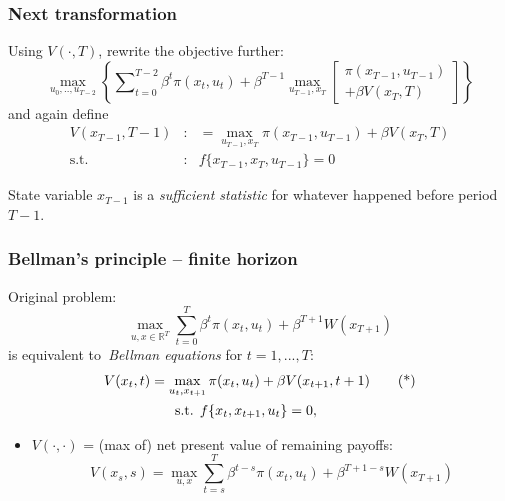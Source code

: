\documentclass[bigger,handout]{beamer}
\newenvironment{stepitemize}{\begin{itemize}[<+->]}{\end{itemize} }
\begin{document}
\begin{frame}%

\frametitle{Next transformation}

Using $V(\cdot ,T)$, rewrite the objective further:%
\begin{equation*}
\max_{u_{0},..,u_{T-2}}\left\{ \sum\nolimits_{t=0}^{T-2}\beta ^{t}\pi
(x_{t},u_{t})+\beta ^{T-1}\max_{u_{T-1},x_{T}}\left[
\begin{array}{c}
\pi (x_{T-1},u_{T-1}) \\
+\beta V(x_{T},T)%
\end{array}%
\right] \right\}
\end{equation*}%
and again define
\begin{eqnarray*}
V(x_{T-1},T-1) &:&=\max_{u_{T-1},x_{T}}\pi (x_{T-1},u_{T-1})+\beta V(x_{T},T)
\\
\text{s.t.} &\text{:}&f\{x_{T-1},x_{T},u_{T-1}\}=0
\end{eqnarray*}

State variable $x_{T-1}$ is a \emph{sufficient statistic} \newline
for whatever happened before period $T-1$.



\end{frame}%



\begin{frame}%

\frametitle{Bellman's principle -- finite horizon}

Original problem:%
\begin{equation*}
\max_{u,x\in \mathbb{R}^{T}}\sum_{t=0}^{T}\beta ^{t}\pi (x_{t},u_{t})+\beta
^{T+1}W(x_{T+1})
\end{equation*}%
is equivalent to\emph{\ Bellman equations} for $t=1,...,T$:
\begin{gather}
V(x_{t},t)=\max_{u_{t},x_{t+1}}\pi (x_{t},u_{t})+\beta V(x_{t+1},t+1)
\tag{*} \\
\text{s.t. }f\{x_{t},x_{t+1},u_{t}\}=0,\qquad  \notag
\end{gather}

\begin{stepitemize}
\item $V(\cdot ,\cdot )$ = (max of) net present value of remaining payoffs:
\begin{equation*}
V(x_{s},s)=\max\limits_{u,x}\sum_{t=s}^{T}\beta ^{t-s}\pi
(x_{t},u_{t})+\beta ^{T+1-s}W(x_{T+1})
\end{equation*}
\end{stepitemize}



\end{frame}%
\end{document}
